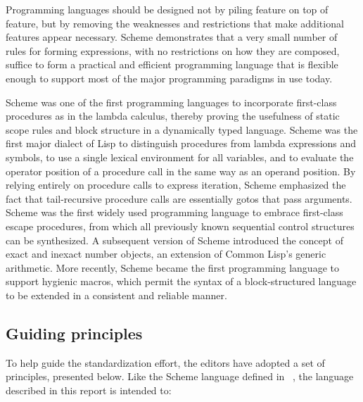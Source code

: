 
\label{historysection}

Programming languages should be designed not by piling feature on top of
feature, but by removing the weaknesses and restrictions that make additional
features appear necessary.  Scheme demonstrates that a very small number
of rules for forming expressions, with no restrictions on how they are
composed, suffice to form a practical and efficient programming language
that is flexible enough to support most of the major programming
paradigms in use today.

Scheme
was one of the first programming languages to incorporate first-class
procedures as in the lambda calculus, thereby proving the usefulness of
static scope rules and block structure in a dynamically typed language.
Scheme was the first major dialect of Lisp to distinguish procedures
from lambda expressions and symbols, to use a single lexical
environment for all variables, and to evaluate the operator position
of a procedure call in the same way as an operand position.  By relying
entirely on procedure calls to express iteration, Scheme emphasized the
fact that tail-recursive procedure calls are essentially gotos that
pass arguments.  Scheme was the first widely used programming language to
embrace first-class escape procedures, from which all previously known
sequential control structures can be synthesized.  A subsequent
version of Scheme introduced the concept of exact and inexact number objects,
an extension of Common Lisp's generic arithmetic.
More recently, Scheme became the first programming language to support
hygienic macros, which permit the syntax of a block-structured language
to be extended in a consistent and reliable manner.

\subsection*{Guiding principles}

To help guide the standardization effort, the editors have adopted a
set of principles, presented below.
Like the Scheme language defined in ~\cite{R5RS}, the language described
in this report is intended to:

